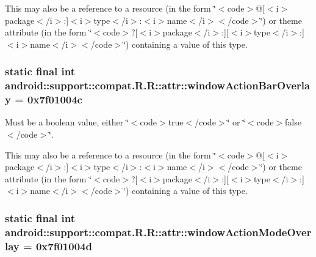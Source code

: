 This may also be a reference to a resource (in the form \char`\"{}$<$code$>$@\mbox{[}$<$i$>$package$<$/i$>$:\mbox{]}$<$i$>$type$<$/i$>$:$<$i$>$name$<$/i$>$$<$/code$>$\char`\"{}) or theme attribute (in the form \char`\"{}$<$code$>$?\mbox{[}$<$i$>$package$<$/i$>$:\mbox{]}\mbox{[}$<$i$>$type$<$/i$>$:\mbox{]}$<$i$>$name$<$/i$>$$<$/code$>$\char`\"{}) containing a value of this type. \hypertarget{classandroid_1_1support_1_1compat_1_1_r_1_1attr_cf23915cb13de444abb7765f9339bf54}{
\subsubsection[{windowActionBarOverlay}]{\setlength{\rightskip}{0pt plus 5cm}static final int android::support::compat.R.R::attr::windowActionBarOverlay = 0x7f01004c}}
\label{classandroid_1_1support_1_1compat_1_1_r_1_1attr_cf23915cb13de444abb7765f9339bf54}


Must be a boolean value, either \char`\"{}$<$code$>$true$<$/code$>$\char`\"{} or \char`\"{}$<$code$>$false$<$/code$>$\char`\"{}. 

This may also be a reference to a resource (in the form \char`\"{}$<$code$>$@\mbox{[}$<$i$>$package$<$/i$>$:\mbox{]}$<$i$>$type$<$/i$>$:$<$i$>$name$<$/i$>$$<$/code$>$\char`\"{}) or theme attribute (in the form \char`\"{}$<$code$>$?\mbox{[}$<$i$>$package$<$/i$>$:\mbox{]}\mbox{[}$<$i$>$type$<$/i$>$:\mbox{]}$<$i$>$name$<$/i$>$$<$/code$>$\char`\"{}) containing a value of this type. \hypertarget{classandroid_1_1support_1_1compat_1_1_r_1_1attr_850845d98bbb149b2115f17dc02b0043}{
\subsubsection[{windowActionModeOverlay}]{\setlength{\rightskip}{0pt plus 5cm}static final int android::support::compat.R.R::attr::windowActionModeOverlay = 0x7f01004d}}
\label{classandroid_1_1support_1_1compat_1_1_r_1_1attr_850845d98bbb149b2115f17dc02b0043}


